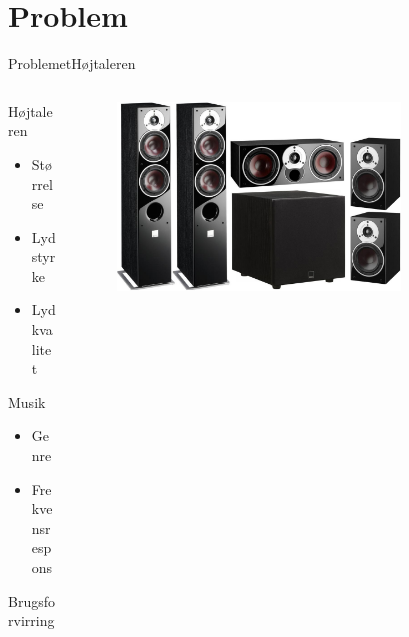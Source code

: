 



\section{Problem}
\begin{frame}{Problemet}{Højtaleren}
\begin{columns}[t]
\begin{column}{0.3\textwidth}
 Højtaleren
	\begin{itemize}
	\item Størrelse
	\item Lydstyrke
	\item Lydkvalitet
	\end{itemize}
    \vspace{5mm}
    Musik
    \begin{itemize}
	\item Genre
	\item Frekvensrespons
	\end{itemize}
	\vspace{5mm}
	Brugsforvirring
\end{column}
\begin{column}{0.65\textwidth}
\begin{figure}
	\centering
	\includegraphics[width=0.8\textwidth]{zensor}
	\end{figure}
\end{column}
\end{columns}
\end{frame}

